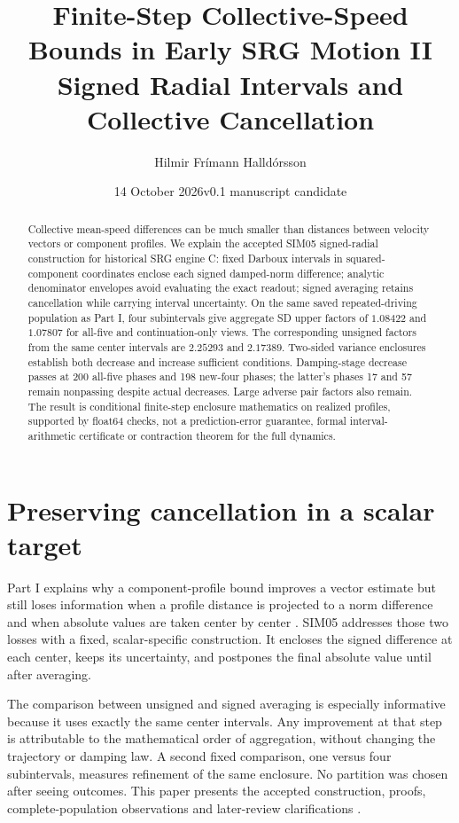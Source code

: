 \documentclass[11pt,a4paper]{article}
\title{\LARGE\bfseries Finite-Step Collective-Speed Bounds in Early SRG Motion II\\[7pt]\large Signed Radial Intervals and Collective Cancellation}
\author{Hilmir Frímann Halldórsson}
\date{14 October 2026\quad\textbar\quad v0.1 manuscript candidate}
\begin{document}
\maketitle
\begin{abstract}
Collective mean-speed differences can be much smaller than distances between velocity vectors or component profiles. We explain the accepted SIM05 signed-radial construction for historical SRG engine C: fixed Darboux intervals in squared-component coordinates enclose each signed damped-norm difference; analytic denominator envelopes avoid evaluating the exact readout; signed averaging retains cancellation while carrying interval uncertainty. On the same saved repeated-driving population as Part I, four subintervals give aggregate SD upper factors of \ensuremath{1.08422} and \ensuremath{1.07807} for all-five and continuation-only views. The corresponding unsigned factors from the same center intervals are \ensuremath{2.25293} and \ensuremath{2.17389}. Two-sided variance enclosures establish both decrease and increase sufficient conditions. Damping-stage decrease passes at 200 all-five phases and 198 new-four phases; the latter's phases 17 and 57 remain nonpassing despite actual decreases. Large adverse pair factors also remain. The result is conditional finite-step enclosure mathematics on realized profiles, supported by float64 checks, not a prediction-error guarantee, formal interval-arithmetic certificate or contraction theorem for the full dynamics.
\end{abstract}

\section{Preserving cancellation in a scalar target}
Part I explains why a component-profile bound improves a vector estimate but still loses information when a profile distance is projected to a norm difference and when absolute values are taken center by center \cite{partone}. SIM05 addresses those two losses with a fixed, scalar-specific construction. It encloses the signed difference at each center, keeps its uncertainty, and postpones the final absolute value until after averaging.

The comparison between unsigned and signed averaging is especially informative because it uses exactly the same center intervals. Any improvement at that step is attributable to the mathematical order of aggregation, without changing the trajectory or damping law. A second fixed comparison, one versus four subintervals, measures refinement of the same enclosure. No partition was chosen after seeing outcomes. This paper presents the accepted construction, proofs, complete-population observations and later-review clarifications \cite{report,math,review}.
\end{document}
